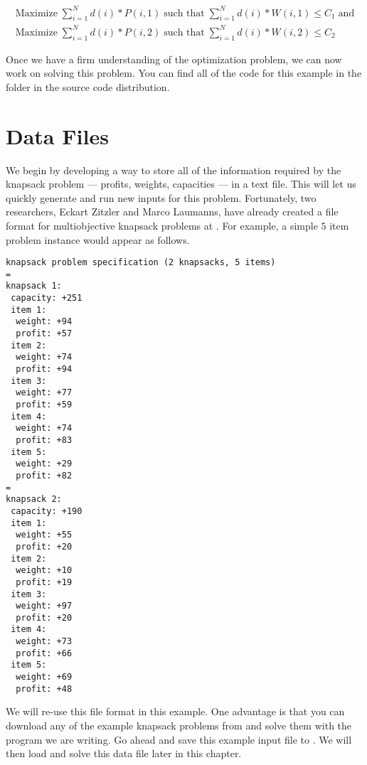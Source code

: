 \begin{equation*}
\begin{array}{l}
  \text{Maximize} \; \sum_{i=1}^{N} d(i)*P(i,1) \; \text{such that} \; \sum_{i=1}^{N} d(i)*W(i,1) \leq C_1 \; \text{and}\\
  \text{Maximize} \; \sum_{i=1}^{N} d(i)*P(i,2) \; \text{such that} \; \sum_{i=1}^{N} d(i)*W(i,2) \leq C_2
\end{array}
\end{equation*}

Once we have a firm understanding of the optimization problem, we can now work on solving this problem.  You can find all of the code for this example in the  folder in the source code distribution.

\section{Data Files}
We begin by developing a way to store all of the information required by the knapsack problem --- profits, weights, capacities --- in a text file.  This will let us quickly generate and run new inputs for this problem.  Fortunately, two researchers, Eckart Zitzler and Marco Laumanns, have already created a file format for multiobjective knapsack problems at .  For example, a simple $5$ item problem instance would appear as follows.  

\begin{lstlisting}[language=plaintext]
knapsack problem specification (2 knapsacks, 5 items)
=
knapsack 1:
 capacity: +251
 item 1:
  weight: +94
  profit: +57
 item 2:
  weight: +74
  profit: +94
 item 3:
  weight: +77
  profit: +59
 item 4:
  weight: +74
  profit: +83
 item 5:
  weight: +29
  profit: +82
=
knapsack 2:
 capacity: +190
 item 1:
  weight: +55
  profit: +20
 item 2:
  weight: +10
  profit: +19
 item 3:
  weight: +97
  profit: +20
 item 4:
  weight: +73
  profit: +66
 item 5:
  weight: +69
  profit: +48
\end{lstlisting}

We will re-use this file format in this example.  One advantage is that you can download any of the example knapsack problems from  and solve them with the program we are writing.  Go ahead and save this example input file to .  We will then load and solve this data file later in this chapter.


